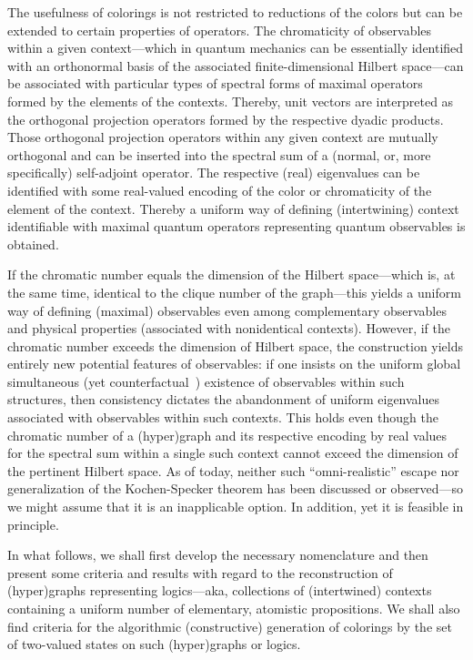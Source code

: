 \documentclass[%
12pt,
prereprint,
showpacs,
showkeys,
preprintnumbers,
amsmath,amssymb,
aps,
pra,
longbibliography,
notitlepage
]{revtex4-1}
\theoremstyle{definition}
\begin{document}
	The usefulness of colorings is not restricted to reductions of the colors but can be extended to certain properties of operators.
	The chromaticity of observables within a given context---which in quantum mechanics can be essentially identified with an orthonormal basis
	of the associated finite-dimensional Hilbert space---can be associated
	with particular types of spectral forms of maximal operators~\cite[\S~84]{halmos-vs} formed by the
	elements of the contexts.
	Thereby, unit vectors are interpreted as the orthogonal projection operators formed by the respective dyadic products.
	Those orthogonal projection operators within any given context are mutually orthogonal and can be
	inserted into the spectral sum of a (normal, or, more specifically) self-adjoint operator.
	The respective (real) eigenvalues can be identified with some real-valued encoding of the color or chromaticity of the element of the context.
	Thereby a uniform way of defining (intertwining) context identifiable with maximal quantum operators representing quantum observables is obtained.
	
	If the chromatic number equals the dimension of the Hilbert
	space---which is, at the same time, identical to the clique number of the graph---this yields
	a uniform way of defining (maximal) observables even among complementary observables and physical properties
	(associated with nonidentical contexts).
	However, if the chromatic number exceeds the dimension of Hilbert space,
	the construction yields entirely new potential features of observables:
	if one insists on the uniform global simultaneous (yet counterfactual~\cite{specker-60}) existence of observables
	within such structures, then consistency dictates the abandonment of uniform eigenvalues associated with observables within such contexts.
	This holds even though the chromatic number of a (hyper)graph and its respective encoding by real values for the spectral sum within a single such context
	cannot exceed the dimension of the pertinent Hilbert space.
	As of today, neither such ``omni-realistic'' escape nor generalization of the Kochen-Specker theorem has been discussed or observed---so we might assume that it is an inapplicable option. In addition, yet it is feasible in principle.
	
	In what follows, we shall first develop the necessary nomenclature and then present some criteria and results with regard to the reconstruction of (hyper)graphs representing
	logics---aka, collections of (intertwined) contexts containing a uniform number of elementary, atomistic propositions.
	We shall also find criteria for the algorithmic (constructive) generation of colorings
	by the set of two-valued states on such (hyper)graphs or logics.
	
\end{document}
